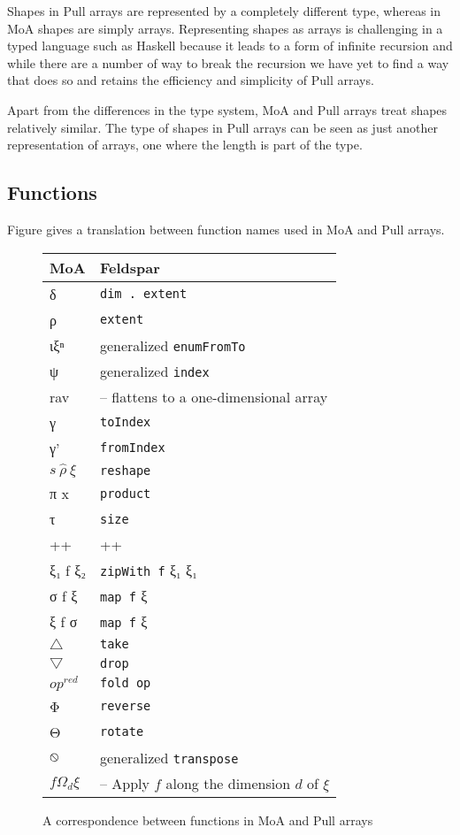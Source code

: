 \documentclass{sigplanconf}
\begin{document}
Shapes in Pull arrays are represented by a completely different type,
whereas in MoA shapes are simply arrays. Representing shapes as arrays
is challenging in a typed language such as Haskell because it leads to
a form of infinite recursion and while there are a number of way to
break the recursion we have yet to find a way that does so and retains
the efficiency and simplicity of Pull arrays.

Apart from the differences in the type system, MoA and Pull arrays
treat shapes relatively similar. The type of shapes in Pull arrays can
be seen as just another representation of arrays, one where the length
is part of the type.

\subsection{Functions}
\label{sec:notation}

Figure  gives a translation between function names
used in MoA and Pull arrays.

\begin{figure}
\begin{center}
\begin{tabular}{|@{}l|l@{}|}
\hline
MoA & Feldspar
\\
\hline
δ & \verb!dim . extent!
\\
ρ & \verb!extent!
\\
ιξⁿ & generalized \verb!enumFromTo!
\\
ψ & generalized \verb!index!
\\
rav & -- flattens to a one-dimensional array
\\
γ & \verb!toIndex!
\\
γ' & \verb!fromIndex!
\\
$s \: \hat{ρ} \: ξ$ & \verb!reshape!
\\
π x & \verb!product!
\\
τ & \verb!size!
\\
++ & ++
\\
ξ₁ f ξ₂ & \verb!zipWith f! ξ₁ ξ₁
\\
σ f ξ & \verb!map f! ξ
\\
ξ f σ & \verb!map f! ξ
\\
$\bigtriangleup$ & \verb!take!
\\
$\bigtriangledown$ & \verb!drop!
\\
$op^{red}$ & \verb!fold op!
\\
Φ & \verb!reverse!
\\
Θ & \verb!rotate!
\\
$\varobslash$ & generalized \verb!transpose!
\\
$f Ω_d ξ$ & -- Apply $f$ along the dimension $d$ of $ξ$
\\
\hline
\end{tabular}
\end{center}
\caption{A correspondence between functions in MoA and Pull arrays}
\label{fig:rosetta}
\end{figure}
\end{document}
